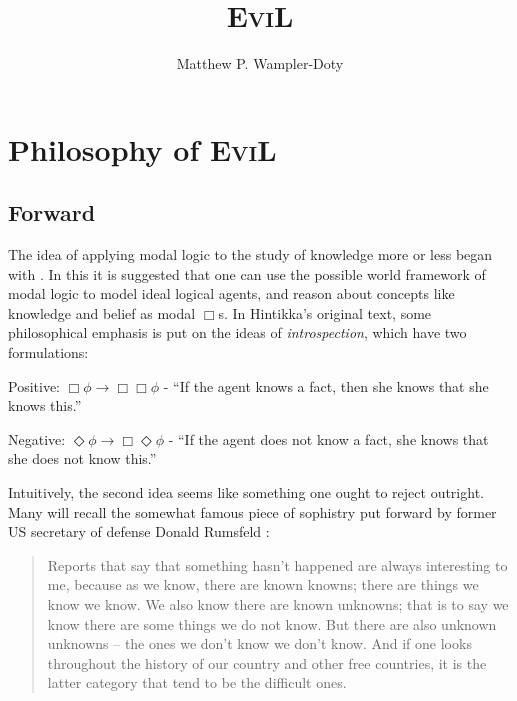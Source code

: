 \documentclass[11pt]{article}
\title{\textsc{EviL}}
\author{Matthew P. Wampler-Doty}
\date{}                                           %
\numberwithin{equation}{subsection}
\newcommand{\Pos}{\Diamond}
\begin{document}
\maketitle
\pagebreak
\tableofcontents
\pagebreak
\section{Philosophy of \textsc{EviL}}\label{philosophy}
\subsection{Forward}
The idea of applying modal logic to the study of knowledge more or less began with \citet{hintikka_knowledge_1969}.  In this it is suggested that one can use the possible world framework of modal logic to model ideal logical agents, and reason about concepts like knowledge and belief as modal $\Box$s.  In Hintikka's original text, some philosophical emphasis is put on the ideas of \emph{introspection}, which have two formulations:
\begin{bul}
	\item Positive: $\Box \phi \to \Box\Box \phi$ - ``If the agent knows a fact, then she knows that she knows this.''
	\item Negative: $\Pos \phi \to \Box\Pos \phi$ - ``If the agent does not know a fact, she knows that she does not know this.''
\end{bul}

Intuitively, the second idea seems like something one ought to reject outright.  Many will recall the somewhat famous piece of sophistry put forward by former US secretary of defense Donald Rumsfeld \citep{rumsfeld_defense.gov_2002}:
\begin{quote}
Reports that say that something hasn't happened are always interesting to me, because as we know, there are known knowns; there are things we know we know. We also know there are known unknowns; that is to say we know there are some things we do not know. But there are also unknown unknowns -- the ones we don't know we don't know. And if one looks throughout the history of our country and other free countries, it is the latter category that tend to be the difficult ones.\end{quote}
\end{document}
